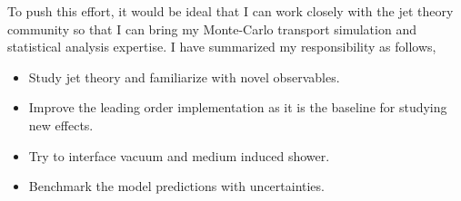 \documentclass[10pt,a4paper]{article}
\begin{document}
To push this effort, it would be ideal that I can work closely with the jet theory community so that I can bring my Monte-Carlo transport simulation and statistical analysis expertise. 
I have summarized my responsibility as follows,
\begin{itemize}
\item Study jet theory and familiarize with novel observables.
\item Improve the leading order implementation as it is the baseline for studying new effects.
\item Try to interface vacuum and medium induced shower.
\item Benchmark the model predictions with uncertainties.
\end{itemize}



\end{document}
